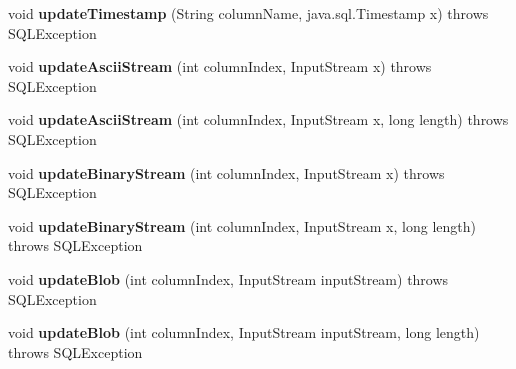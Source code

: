 \begin{DoxyCompactItemize}
void {\bfseries update\+Timestamp} (String column\+Name, java.\+sql.\+Timestamp x)  throws S\+Q\+L\+Exception 
\item 
\mbox{\label{classcom_1_1mysql_1_1cj_1_1jdbc_1_1result_1_1_updatable_result_set_a006fe90cea1b6aacbeb886245c355eec}} 
void {\bfseries update\+Ascii\+Stream} (int column\+Index, Input\+Stream x)  throws S\+Q\+L\+Exception 
\item 
\mbox{\label{classcom_1_1mysql_1_1cj_1_1jdbc_1_1result_1_1_updatable_result_set_a2cbcdfde23935cce692af071e50342d5}} 
void {\bfseries update\+Ascii\+Stream} (int column\+Index, Input\+Stream x, long length)  throws S\+Q\+L\+Exception 
\item 
\mbox{\label{classcom_1_1mysql_1_1cj_1_1jdbc_1_1result_1_1_updatable_result_set_a779f54f0209ebcd662392a49d2973157}} 
void {\bfseries update\+Binary\+Stream} (int column\+Index, Input\+Stream x)  throws S\+Q\+L\+Exception 
\item 
\mbox{\label{classcom_1_1mysql_1_1cj_1_1jdbc_1_1result_1_1_updatable_result_set_a3ad502758fb5864d80ba4817f6b2b03b}} 
void {\bfseries update\+Binary\+Stream} (int column\+Index, Input\+Stream x, long length)  throws S\+Q\+L\+Exception 
\item 
\mbox{\label{classcom_1_1mysql_1_1cj_1_1jdbc_1_1result_1_1_updatable_result_set_a8f51d67dba1ac190205c03e0dc562b47}} 
void {\bfseries update\+Blob} (int column\+Index, Input\+Stream input\+Stream)  throws S\+Q\+L\+Exception 
\item 
\mbox{\label{classcom_1_1mysql_1_1cj_1_1jdbc_1_1result_1_1_updatable_result_set_a9efda66453df8e106f3452d486d860eb}} 
void {\bfseries update\+Blob} (int column\+Index, Input\+Stream input\+Stream, long length)  throws S\+Q\+L\+Exception 
\item 
\mbox{\label{classcom_1_1mysql_1_1cj_1_1jdbc_1_1result_1_1_updatable_result_set_aff6bc276e21865222e111a22bc1266cd}} 

\end{DoxyCompactItemize}
